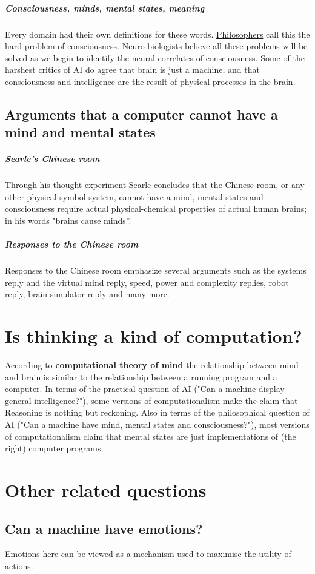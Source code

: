 \documentclass[10pt,a4paper,twoside]{article}
\begin{document}
\subparagraph{Consciousness, minds, mental states, meaning}
Every domain had their own definitions for these words. \underline{Philosophers} call this the hard problem of consciousness. \underline{Neuro-biologists} believe all these problems will be solved as we begin to identify the neural correlates of consciousness. Some of the harshest critics of AI do agree that brain is just a machine, and that consciousness and intelligence are the result of physical processes in the brain. 

\subsection{Arguments that a computer cannot have a mind and mental states}
\subparagraph{Searle's Chinese room }
Through his thought experiment Searle concludes that the Chinese room, or any other physical symbol system, cannot have a mind, mental states and consciousness require actual physical-chemical properties of actual human brains; in his words "brains cause minds”.

\subparagraph{Responses to the Chinese room}
Responses to the Chinese room emphasize several arguments such as the systems reply and the virtual mind reply, speed, power and complexity replies, robot reply, brain simulator reply and many more.

\section{Is thinking a kind of computation?}
According to \textbf{computational theory of mind} the relationship between mind and brain is similar to the relationship between a running program and a computer. In terms of the practical question of AI ("Can a machine display general intelligence?"), some versions of computationalism make the claim that Reasoning is nothing but reckoning. Also in terms of the philosophical question of AI ("Can a machine have mind, mental states and consciousness?"), most versions of computationalism claim that mental states are just implementations of (the right) computer programs. 

\section{Other related questions}
\subsection{Can a machine have emotions?} Emotions here can be viewed as a mechanism used to maximise the utility of actions.
\end{document}
